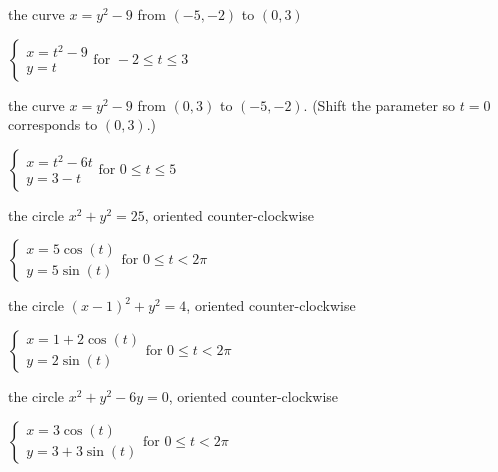 \documentclass{ximera}
\begin{document}
\begin{question}
\begin{problem}
 the curve $x = y^2 - 9$ from $(-5,-2)$ to $(0,3)$

 \begin{solution}
${ \left\{ \begin{array}{l} x = t^2-9 \\ y = t  \end{array} \right. \text{for } -2 \leq t \leq 3}$
 \end{solution}
\end{problem}

\begin{problem}
 the curve $x = y^2 - 9$ from $(0,3)$ to $(-5,-2)$.
(Shift the parameter so  $t=0$ corresponds to $(0,3)$.)

\begin{solution}
 ${ \left\{ \begin{array}{l} x = t^2-6t \\ y = 3-t  \end{array} \right. \text{for } 0 \leq t \leq 5}$
\end{solution}
\end{problem}

\begin{problem}
 the circle $x^2 + y^2 = 25$, oriented counter-clockwise

 \begin{solution}
 ${ \left\{ \begin{array}{l} x = 5\cos(t) \\ y = 5\sin(t)  \end{array} \right. \text{for } 0 \leq t < 2\pi}$
 \end{solution}
\end{problem}

\begin{problem}
the circle $(x-1)^2 + y^2 = 4$, oriented counter-clockwise

\begin{solution}
 ${ \left\{ \begin{array}{l} x = 1+2\cos(t) \\ y = 2\sin(t)  \end{array} \right. \text{for } 0 \leq t < 2\pi}$
\end{solution}
\end{problem}

\begin{problem}
the circle $x^2 + y^2 - 6y = 0$, oriented counter-clockwise

\begin{solution}
${ \left\{ \begin{array}{l} x = 3\cos(t) \\ y = 3 + 3\sin(t)  \end{array} \right. \text{for } 0 \leq t < 2\pi}$
\end{solution}
\end{problem}


\end{question}
\end{document}
